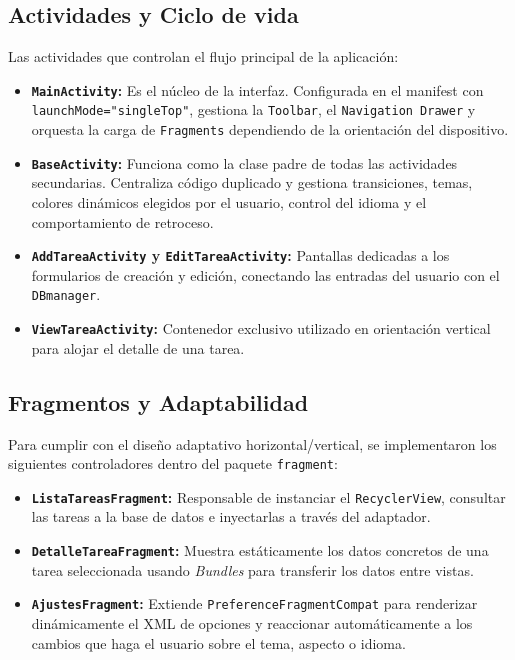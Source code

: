 \documentclass{article}
\begin{document}
\subsection{Actividades y Ciclo de vida}

Las actividades que controlan el flujo principal de la aplicación:

\begin{itemize}
    \item \textbf{\texttt{MainActivity}:} Es el núcleo de la interfaz. Configurada en el manifest con \texttt{launchMode="singleTop"}, gestiona la \texttt{Toolbar}, el \texttt{Navigation Drawer} y orquesta la carga de \texttt{Fragments} dependiendo de la orientación del dispositivo.
    \item \textbf{\texttt{BaseActivity}:} Funciona como la clase padre de todas las actividades secundarias. Centraliza código duplicado y gestiona transiciones, temas, colores dinámicos elegidos por el usuario, control del idioma y el comportamiento de retroceso.
    \item \textbf{\texttt{AddTareaActivity} y \texttt{EditTareaActivity}:} Pantallas dedicadas a los formularios de creación y edición, conectando las entradas del usuario con el \texttt{DBmanager}.
    \item \textbf{\texttt{ViewTareaActivity}:} Contenedor exclusivo utilizado en orientación vertical para alojar el detalle de una tarea.
\end{itemize}

\subsection{Fragmentos y Adaptabilidad}

Para cumplir con el diseño adaptativo horizontal/vertical, se implementaron los siguientes controladores dentro del paquete \texttt{fragment}:

\begin{itemize}
    \item \textbf{\texttt{ListaTareasFragment}:} Responsable de instanciar el \texttt{RecyclerView}, consultar las tareas a la base de datos e inyectarlas a través del adaptador.
    \item \textbf{\texttt{DetalleTareaFragment}:} Muestra estáticamente los datos concretos de una tarea seleccionada usando \textit{Bundles} para transferir los datos entre vistas.
    \item \textbf{\texttt{AjustesFragment}:} Extiende \texttt{Preference\allowbreak Fragment\allowbreak Compat} para renderizar dinámicamente el XML de opciones y reaccionar automáticamente a los cambios que haga el usuario sobre el tema, aspecto o idioma.
\end{itemize}
\end{document}
